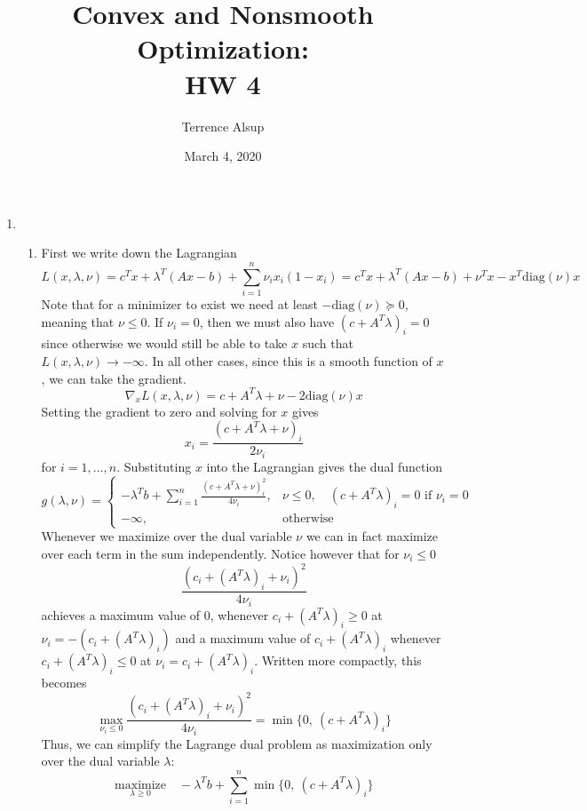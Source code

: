 \documentclass[11pt]{amsart}
\title{Convex and Nonsmooth Optimization:\\HW 4}
\author{Terrence Alsup}
\date{March 4, 2020}
\begin{document}
\maketitle
\begin{enumerate}
\item \begin{enumerate}
\item  First we write down the Lagrangian 
\[
L(x,\lambda,\nu) = c^Tx + \lambda^T(Ax - b) + \sum_{i=1}^n \nu_i x_i(1 - x_i) = c^Tx + \lambda^T(Ax - b) + \nu^Tx - x^T \mathrm{diag}(\nu)x
\]
Note that for a minimizer to exist we need at least $-\mathrm{diag}(\nu) \succeq 0$, meaning that $\nu \le 0$.  If $\nu_i = 0$, then we must also have $(c + A^T\lambda)_i =0$ since otherwise we would still be able to take $x$ such that $L(x,\lambda,\nu) \to -\infty$.  In all other cases, since this is a smooth function of $x$, we can take the gradient.
\[
\nabla_x L(x,\lambda,\nu) = c + A^T\lambda + \nu - 2\mathrm{diag}(\nu)x
\]
Setting the gradient to zero and solving for $x$ gives
\[
x_i = \frac{(c + A^T\lambda + \nu)_i}{2\nu_i}
\]
for $i=1,\ldots,n$.  Substituting $x$ into the Lagrangian gives the dual function
\[
g(\lambda,\nu) = \begin{cases}
 -\lambda^T b + \sum_{i=1}^n \frac{ (c + A^T\lambda + \nu)^2_i }{4\nu_i},& \nu \le 0,\quad (c + A^T\lambda)_i = 0 \text{  if  } \nu_i = 0\\
-\infty,& \text{otherwise}
\end{cases}
\]
Whenever we maximize over the dual variable $\nu$ we can in fact maximize over each term in the sum independently.  Notice however that for $\nu_i \le 0$
\[
\frac{(c_i + (A^T\lambda)_i + \nu_i)^2}{4\nu_i}
\]
achieves a maximum value of $0$, whenever $c_i + (A^T\lambda)_i \ge 0$ at $\nu_i = -(c_i + (A^T\lambda)_i)$ and a maximum value of $c_i +( A^T\lambda)_i$ whenever $c_i + (A^T\lambda)_i \le 0$ at $\nu_i = c_i + (A^T\lambda)_i$.  Written more compactly, this becomes
\[
\max_{\nu_i \le 0} \frac{(c_i + (A^T\lambda)_i + \nu_i)^2}{4\nu_i} = \min \{ 0,\ (c + A^T\lambda)_i \}
\]
Thus, we can simplify the Lagrange dual problem as maximization only over the dual variable $\lambda$:
\[
\underset{\lambda \ge 0}{\mathrm{maximize}}\quad -\lambda^Tb + \sum_{i=1}^n  \min \{ 0,\ (c + A^T\lambda)_i \}
\]







\end{enumerate}
\end{enumerate}
\end{document}
